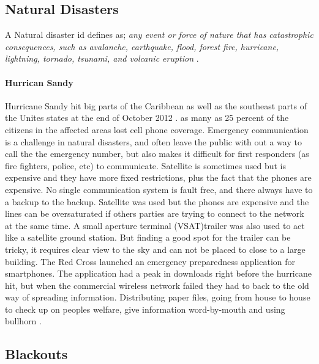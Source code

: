 \subsection{Natural Disasters}
A Natural disaster id defines as; \textit{any event or force of nature that has catastrophic consequences, such as avalanche, earthquake, flood, forest fire, hurricane, lightning, tornado, tsunami, and volcanic eruption} \cite{naturalDisaster}.



\paragraph{Hurrican Sandy}
Hurricane Sandy hit big parts of the Caribbean as well as the southeast parts of the Unites states at the end of October 2012 \cite{WikiSandy}. as many as 25 percent of the citizens in the affected areas lost cell phone coverage. Emergency communication is a challenge in natural disasters, and often leave the public with out a way to call the the emergency number, but also makes it difficult for first responders (as fire fighters, police, etc) to communicate.  Satellite is sometimes used but is expensive and they have more fixed restrictions, plus the fact that the phones are expensive. No single communication system is fault free, and there always have to a backup to the backup. Satellite was used but the phones are expensive and the lines can be oversaturated if others parties are trying to connect to the network at the same time. A small aperture terminal (VSAT)trailer was also used to act like a satellite ground station. But finding a good spot for the trailer can be tricky, it requires clear view to the sky and can not be placed to close to a large building. The Red Cross launched an emergency preparedness application for smartphones. The application had a peak in downloads right before the hurricane hit, but when the commercial wireless network failed they had to back to the old way of spreading information. Distributing paper files, going from house to house to check up on peoples welfare, give information word-by-mouth and using bullhorn \cite{hurricaneSandy}.



\subsection{Blackouts}

